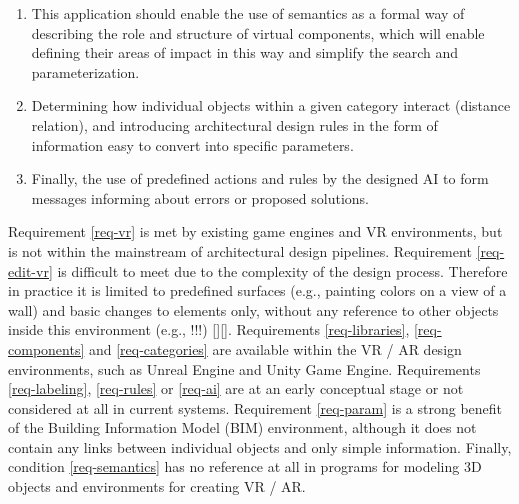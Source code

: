 \documentclass[runningheads]{llncs}
\begin{document}
\begin{enumerate}
\item	\label{req-semantics} This application should enable the use of semantics as a formal way of describing the role and structure of virtual components, which will enable defining their areas of impact in this way and simplify the search and parameterization.\\

\item	\label{req-rules} Determining how individual objects within a given category interact (distance relation), and introducing architectural design rules in the form of information easy to convert into specific parameters.\\

\item 	\label{req-ai} Finally, the use of predefined actions and rules by the designed AI to form messages informing about errors or proposed solutions.\\
\end{enumerate}

Requirement \ref{req-vr} is met by existing game engines and VR environments, but is not within the mainstream of architectural design pipelines. Requirement \ref{req-edit-vr} is difficult to meet due to the complexity of the design process. Therefore in practice it is limited to predefined surfaces (e.g., painting colors on a view of a wall) and basic changes to elements only, without any reference to other objects inside this environment (e.g., !!!) [][]. Requirements \ref{req-libraries}, \ref{req-components} and \ref{req-categories} are available within the VR / AR design environments, such as Unreal Engine and Unity  Game Engine. Requirements \ref{req-labeling}, \ref{req-rules} or \ref{req-ai} are at an early conceptual stage or not considered at all in current systems. Requirement \ref{req-param} is a strong benefit of the Building Information Model (BIM) environment, although it does not contain any links between individual objects and only simple information. Finally, condition \ref{req-semantics} has no reference at all in programs for modeling 3D objects and environments for creating VR / AR.
\end{document}
